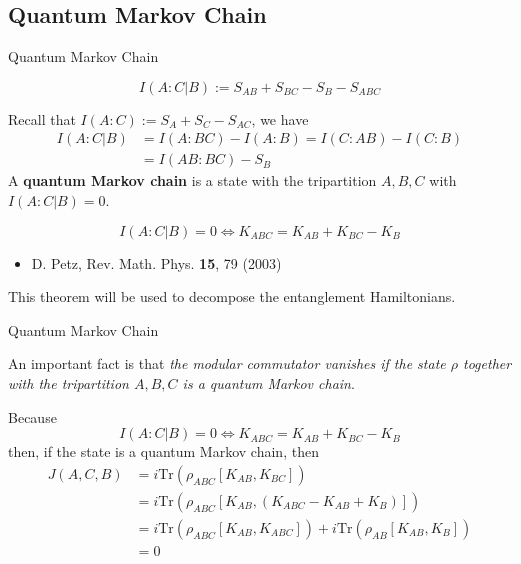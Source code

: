 \documentclass[professionalfont]{beamer}
\newcommand{\lr}[1]{\left(#1\right)}
\newcommand{\mrm}[1]{\mathrm{#1}}
\begin{document}
\subsection{Quantum Markov Chain}
\begin{frame}{Quantum Markov Chain}
    \begin{definition}
        \[
        I(A:C|B) := S_{AB}+S_{BC}-S_{B}-S_{ABC}
        \]
    \end{definition}
    {\footnotesize
    Recall that $I(A:C):=S_A+S_C-S_{AC}$, we have
    \begin{align*}
        I(A:C|B) &= I(A:BC)-I(A:B) = I(C:AB)-I(C:B)\\
        &= I(AB:BC)-S_B
    \end{align*}    }
    A \textbf{quantum Markov chain} is a state with the tripartition $A,B,C$ with $I(A:C|B)=0$.
    \vspace{-0.1cm}
    \begin{theorem}[D. Petz (2003)]
    \[
    I(A:C|B) = 0 \Leftrightarrow K_{ABC} = K_{AB} + K_{BC} - K_{B}
    \]
    \end{theorem}
{
\tiny
\begin{itemize}
    \item D. Petz, Rev. Math. Phys. \textbf{15}, 79 (2003)
\end{itemize}
}
This theorem will be used to decompose the entanglement Hamiltonians.
\end{frame}
\begin{frame}{Quantum Markov Chain}

    {\large
    An important fact is that \textit{the modular commutator vanishes if the state $\rho$ together with the tripartition $A,B,C$ is a quantum Markov chain}.
    }

     

\vspace{0.5cm}

    Because
    \[
    I(A:C|B) = 0 \Leftrightarrow K_{ABC} = K_{AB} + K_{BC} - K_{B}
    \]
then, if the state is a quantum Markov chain, then 
    \begin{align*}
        J(A,C,B)& = i\mrm{Tr}\lr{\rho_{ABC}[K_{AB},K_{BC}]} \\
        &= i\mrm{Tr}\lr{\rho_{ABC}[K_{AB},\lr{K_{ABC}-K_{AB}+K_B}]} \\
        &= i\mrm{Tr}\lr{\rho_{ABC}[K_{AB},K_{ABC}]} + i\mrm{Tr}\lr{\rho_{AB}[K_{AB},K_B]} \\
        &= 0
    \end{align*}
\end{frame}
\end{document}
